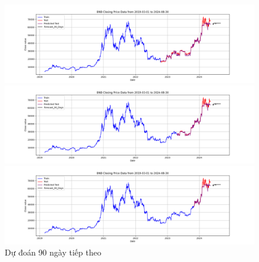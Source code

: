 \documentclass[conference]{IEEEtran}
\begin{document}
\begin{figure}[H]
    \centering
    \begin{minipage}{0.15\textwidth}
    \centering
    \includegraphics[width=1\textwidth]{Figure/RandomForest_BTC_90days_73.png}
    \end{minipage}
    \hfill
    \begin{minipage}{0.15\textwidth}
    \centering
    \includegraphics[width=1\textwidth]{Figure/RandomForest_BTC_90days_82.png}
    \end{minipage}
    \hfill
    \begin{minipage}{0.15\textwidth}
    \centering
    \includegraphics[width=1\textwidth]{Figure/RandomForest_BTC_90days_91.png}
    \end{minipage}
    \caption{Dự đoán 90 ngày tiếp theo}
    \label{fig:1}
\end{figure}
\end{document}
